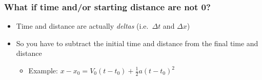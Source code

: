 \documentclass[
  letterpaper,
  DIV=11,
  numbers=noendperiod]{scrartcl}
\providecommand{\tightlist}{%
  \setlength{\itemsep}{0pt}\setlength{\parskip}{0pt}}\usepackage{longtable,booktabs,array}
\begin{document}
\hypertarget{what-if-time-andor-starting-distance-are-not-0}{%
\subsubsection{What if time and/or starting distance are not
0?}\label{what-if-time-andor-starting-distance-are-not-0}}

\begin{itemize}
\tightlist
\item
  Time and distance are actually \emph{deltas} (i.e.~\(\Delta t\) and
  \(\Delta x\))
\item
  So you have to subtract the initial time and distance from the final
  time and distance

  \begin{itemize}
  \tightlist
  \item
    Example: \(x-x_0 = V_0(t-t_0) + \frac{1}{2}a(t-t_0)^2\)
  \end{itemize}
\end{itemize}
\end{document}
